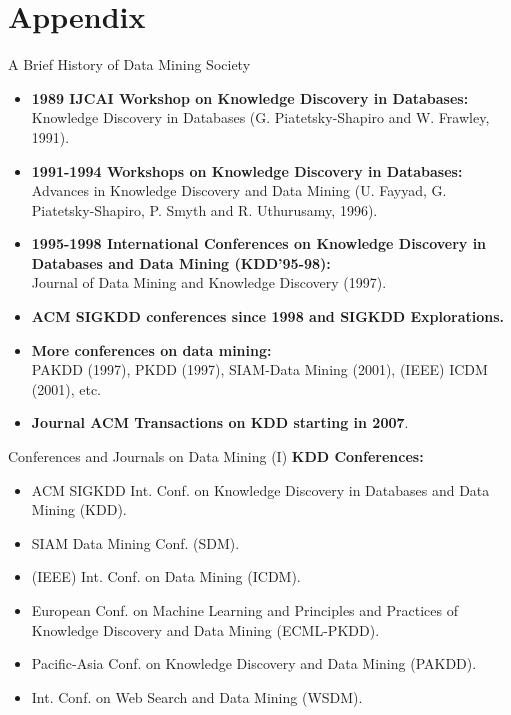 \section*{Appendix}

\begin{frame}{A Brief History of Data Mining Society}
	\begin{itemize}
		\item \textbf{1989 IJCAI Workshop on Knowledge Discovery in 
		Databases:}\\
		Knowledge Discovery in Databases (G. Piatetsky-Shapiro and W. Frawley, 
		1991).
		\item \textbf{1991-1994 Workshops on Knowledge Discovery in 
		Databases:}\\
		Advances in Knowledge Discovery and Data Mining (U. Fayyad, G. 
		Piatetsky-Shapiro, P. Smyth and R. Uthurusamy, 1996).
		\item \textbf{1995-1998 International Conferences on Knowledge 
		Discovery in Databases and Data Mining (KDD’95-98):}\\
		Journal of Data Mining and Knowledge Discovery (1997).
		\item \textbf{ACM SIGKDD conferences since 1998 and SIGKDD 
		Explorations.}\\
		\item \textbf{More conferences on data mining:}\\
		PAKDD (1997), PKDD (1997), SIAM-Data Mining (2001), (IEEE) ICDM (2001), 
		etc.
		\item \textbf{Journal ACM Transactions on KDD starting in 2007}.
	\end{itemize}
\end{frame}

\begin{frame}{Conferences and Journals on Data Mining (I)}
	\textbf{KDD Conferences:}
	\begin{itemize}
		\item ACM SIGKDD Int. Conf. on Knowledge Discovery in Databases and 
		Data Mining (KDD).
		\item SIAM Data Mining Conf. (SDM).
		\item (IEEE) Int. Conf. on Data Mining (ICDM).
		\item European Conf. on Machine Learning and Principles and Practices 
		of Knowledge Discovery and Data Mining (ECML-PKDD).
		\item Pacific-Asia Conf. on Knowledge Discovery and Data Mining (PAKDD).
		\item Int. Conf. on Web Search and Data Mining (WSDM).
	\end{itemize}
\end{frame}

